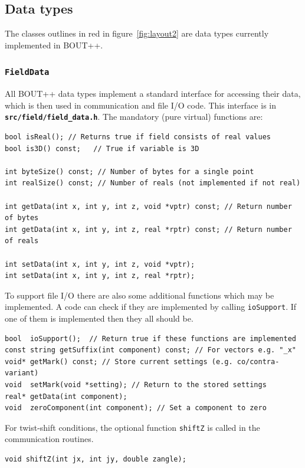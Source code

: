 \documentclass[12pt]{article}
\newcommand{\code}[1]{\texttt{#1}}
\newcommand{\file}[1]{\texttt{\bf #1}}
\begin{document}
\subsection{Data types}

The classes outlines in red in figure~\ref{fig:layout2} are data types 
currently implemented in BOUT++. 

\subsubsection{\code{FieldData}}

All BOUT++ data types implement a standard interface for accessing their
data, which is then used in communication and file I/O code. This interface
is in \file{src/field/field\_data.h}. The mandatory (pure virtual) functions are:
\begin{lstlisting}
bool isReal(); // Returns true if field consists of real values
bool is3D() const;   // True if variable is 3D
  
int byteSize() const; // Number of bytes for a single point
int realSize() const; // Number of reals (not implemented if not real)
  
int getData(int x, int y, int z, void *vptr) const; // Return number of bytes
int getData(int x, int y, int z, real *rptr) const; // Return number of reals
  
int setData(int x, int y, int z, void *vptr);
int setData(int x, int y, int z, real *rptr);
\end{lstlisting}

To support file I/O there are also some additional functions which may be implemented.
A code can check if they are implemented by calling \code{ioSupport}. If one of them
is implemented then they all should be.
\begin{lstlisting}
bool  ioSupport();  // Return true if these functions are implemented
const string getSuffix(int component) const; // For vectors e.g. "_x"
void* getMark() const; // Store current settings (e.g. co/contra-variant)
void  setMark(void *setting); // Return to the stored settings
real* getData(int component); 
void  zeroComponent(int component); // Set a component to zero
\end{lstlisting}  

For twist-shift conditions, the optional function \code{shiftZ} is called in the communication
routines.
\begin{lstlisting}
void shiftZ(int jx, int jy, double zangle);
\end{lstlisting}
\end{document}
